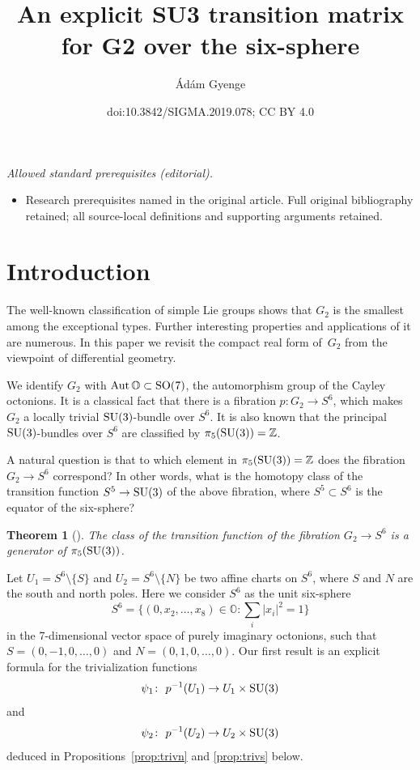 \documentclass[10pt,a4paper]{amsart}
\title{An explicit SU3 transition matrix for G2 over the six-sphere}
\author{Ádám Gyenge}
\date{doi:10.3842/SIGMA.2019.078; CC BY 4.0}
\numberwithin{equation}{section}
\newtheorem{Theorem}{Theorem}[section]
\DeclareMathOperator{\Aut}{Aut}
\newcommand{\SZ}{\mathbb{Z}} %
\newcommand{\SO}{\mathbb{O}} %
\begin{document}
\maketitle
\noindent\textit{Allowed standard prerequisites (editorial).}\begin{itemize}
\item Research prerequisites named in the original article. Full original bibliography retained; all source-local definitions and supporting arguments retained.
\end{itemize}\medskip
\section{Introduction}

The well-known classification of simple Lie groups shows that $G_2$ is the smallest among the exceptional types. Further interesting properties and applications of it are numerous. In this paper we revisit the compact real form of~$G_2$ from the viewpoint of differential geometry.

We identify $G_2$ with $ \Aut \SO \subset {\rm SO}(7)$, the automorphism group of the Cayley octonions. It is a classical fact that there is a fibration $p\colon G_2 \rightarrow S^6$, which makes $G_2$ a locally trivial ${\rm SU}(3)$-bundle over $S^6$. It is also known that the principal ${\rm SU}(3)$-bundles over $S^6$ are classified by $\pi_5({\rm SU}(3))=\SZ $.

A natural question is that to which element in $\pi_5({\rm SU}(3))=\SZ $ does the fibration $G_2 \rightarrow S^6$ correspond? In other words, what is the homotopy class of the transition function $S^5 \rightarrow {\rm SU}(3)$ of the above fibration, where $S^5 \subset S^6$ is the equator of the six-sphere?
\begin{Theorem}[{\cite[Proposition~2]{chaves96complex}}]\label{thm:transfun}
 The class of the transition function of the fibration $G_2 \rightarrow S^6$ is a generator of $\pi_{5}({\rm SU}(3))$.
\end{Theorem}

Let $U_1 = S^6{\setminus}\{ S \}$ and $U_2 = S^6{\setminus}\{ N \}$ be two affine charts on $S^6$, where $S$ and $N$ are the south and north poles. Here we consider $S^6$ as the unit six-sphere
\[ S^6=\bigg\{(0,x_2,\dots,x_8) \in \mathbb{O}\colon \sum_i|x_i|^2=1 \bigg\}\]
in the 7-dimensional vector space of purely imaginary octonions, such that $S=(0,-1,0,\dots,0)$ and $N=(0,1,0,\dots,0)$. Our first result is
an explicit formula for the trivialization functions
\[ \psi_1 \colon \ p^{-1}(U_1) \rightarrow U_1 \times {\rm SU}(3) \]
and
\[ \psi_2 \colon \ p^{-1}(U_2) \rightarrow U_2 \times {\rm SU}(3) \]
deduced in Propositions~\ref{prop:trivn} and \ref{prop:trivs} below.
\end{document}
